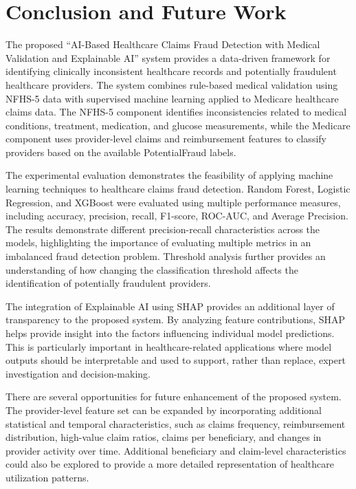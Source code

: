 \chapter{Conclusion and Future Work}

The proposed ``AI-Based Healthcare Claims Fraud Detection with Medical Validation and Explainable AI'' system provides a data-driven framework for identifying clinically inconsistent healthcare records and potentially fraudulent healthcare providers. The system combines rule-based medical validation using NFHS-5 data with supervised machine learning applied to Medicare healthcare claims data. The NFHS-5 component identifies inconsistencies related to medical conditions, treatment, medication, and glucose measurements, while the Medicare component uses provider-level claims and reimbursement features to classify providers based on the available PotentialFraud labels.

The experimental evaluation demonstrates the feasibility of applying machine learning techniques to healthcare claims fraud detection. Random Forest, Logistic Regression, and XGBoost were evaluated using multiple performance measures, including accuracy, precision, recall, F1-score, ROC-AUC, and Average Precision. The results demonstrate different precision-recall characteristics across the models, highlighting the importance of evaluating multiple metrics in an imbalanced fraud detection problem. Threshold analysis further provides an understanding of how changing the classification threshold affects the identification of potentially fraudulent providers.

The integration of Explainable AI using SHAP provides an additional layer of transparency to the proposed system. By analyzing feature contributions, SHAP helps provide insight into the factors influencing individual model predictions. This is particularly important in healthcare-related applications where model outputs should be interpretable and used to support, rather than replace, expert investigation and decision-making.

There are several opportunities for future enhancement of the proposed system. The provider-level feature set can be expanded by incorporating additional statistical and temporal characteristics, such as claims frequency, reimbursement distribution, high-value claim ratios, claims per beneficiary, and changes in provider activity over time. Additional beneficiary and claim-level characteristics could also be explored to provide a more detailed representation of healthcare utilization patterns.

